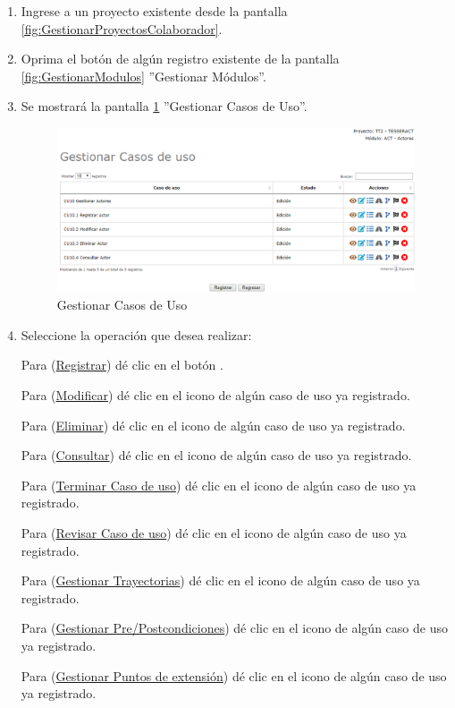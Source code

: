 			\begin{enumerate}
				
			\item Ingrese a un proyecto existente desde la pantalla \ref{fig:GestionarProyectosColaborador}.
			
			\item Oprima el botón \IUCU{} de algún registro existente de la pantalla \ref{fig:GestionarModulos} ''Gestionar Módulos''.
	
			\item Se mostrará la pantalla \ref{fig:GestionarCU} ''Gestionar Casos de Uso''.

			\begin{figure}[htbp!]
				\begin{center}
					\includegraphics[scale=0.6]{roles/lider/casosUso/pantallas/IU6gestionarCU}
					\caption{Gestionar Casos de Uso}
					\label{fig:GestionarCU}
				\end{center}
			\end{figure}
		
				\item Seleccione la operación que desea realizar:
			
			Para (\hyperlink{cv:registrarCU}{Registrar}) dé clic en el botón \IURegistrar.
			
			Para (\hyperlink{cv:modificarCU}{Modificar}) dé clic en el icono \IUEditar{} de algún caso de uso ya registrado.
			
			Para (\hyperlink{cv:eliminarCU}{Eliminar}) dé clic en el icono \IUBotonEliminar{} de algún caso de uso ya registrado.
			
			Para (\hyperlink{cv:consultarCU}{Consultar}) dé clic en el icono \IUConsultar{} de algún caso de uso ya registrado.
			
			Para (\hyperlink{cv:terminarCU}{Terminar Caso de uso}) dé clic en el icono \IUTerminar{} de algún caso de uso ya registrado.
			
			Para (\hyperlink{cv:revisarCU}{Revisar Caso de uso}) dé clic en el icono \IURevisar{} de algún caso de uso ya registrado.
			
			Para (\hyperlink{cv:GestionarTray}{Gestionar Trayectorias}) dé clic en el icono \IUTray{} de algún caso de uso ya registrado.
			
			Para (\hyperlink{cv:GestionarTray}{Gestionar Pre/Postcondiciones}) dé clic en el icono \IUCondiciones{} de algún caso de uso ya registrado.
			
			Para (\hyperlink{cv:GestionarPExt}{Gestionar Puntos de extensión}) dé clic en el icono \IUPext{} de algún caso de uso ya registrado.
			\end{enumerate}